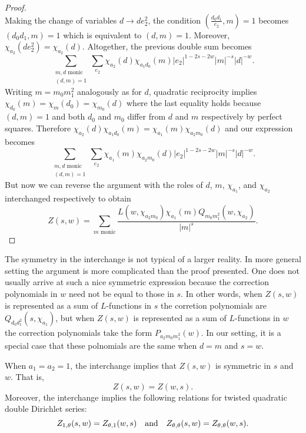 \documentclass[12pt,reqno,oneside]{amsart}
\begin{document}
\begin{proof}
\[        \]
        Making the change of variables $d \to de_{2}^{2}$, the condition $\left(\frac{d_{0}d_{1}}{e_{2}},m\right) = 1$ becomes $(d_{0}d_{1},m) = 1$ which is equivalent to $(d,m) = 1$. Moreover, $\chi_{a_{2}}(de_{2}^{2}) = \chi_{a_{2}}(d)$. Altogether, the previous double sum becomes
        \[
            \sum_{\substack{\text{$m,d$ monic} \\ (d,m) = 1}}\sum_{e_{2}}\chi_{a_{2}}(d)\chi_{a_{1}d_{0}}(m)|e_{2}|^{1-2s-2w}|m|^{-s}|d|^{-w}.
        \]
        Writing $m = m_{0}m_{1}^{2}$ analogously as for $d$, quadratic reciprocity implies $\chi_{d_{0}}(m) = \chi_{m}(d_{0}) = \chi_{m_{0}}(d)$ where the last equality holds because $(d,m) = 1$ and both $d_{0}$ and $m_{0}$ differ from $d$ and $m$ respectively by perfect squares. Therefore $\chi_{a_{2}}(d)\chi_{a_{1}d_{0}}(m) = \chi_{a_{1}}(m)\chi_{a_{2}m_{0}}(d)$ and our expression becomes
        \[
            \sum_{\substack{\text{$m,d$ monic} \\ (d,m) = 1}}\sum_{e_{2}}\chi_{a_{1}}(m)\chi_{a_{2}m_{0}}(d)|e_{2}|^{1-2s-2w}|m|^{-s}|d|^{-w}.
        \]
        But now we can reverse the argument with the roles of $d$, $m$, $\chi_{a_{1}}$, and $\chi_{a_{2}}$ interchanged respectively to obtain
        \[
            Z(s,w) = \sum_{\text{$m$ monic}}\frac{L(w,\chi_{a_{2}m_{0}})\chi_{a_{1}}(m)Q_{m_{0}m_{1}^{2}}(w,\chi_{a_{2}})}{|m|^{s}}.
        \]
    \end{proof}

    The symmetry in the interchange is not typical of a larger reality. In more general setting the argument is more complicated than the proof presented. One does not usually arrive at such a nice symmetric expression because the correction polynomials in $w$ need not be equal to those in $s$. In other words, when $Z(s,w)$ is represented as a sum of $L$-functions in $s$ the corretion polynomials are $Q_{d_{0}d_{1}^{2}}(s,\chi_{a_{1}})$, but when $Z(s,w)$ is represented as a sum of $L$-functions in $w$ the correction polynomials take the form $P_{a_{2}m_{0}m_{1}^{2}}(w)$. In our setting, it is a special case that these polnomials are the same when $d = m$ and $s = w$.

    \begin{remark}\label{rem:symmetry_of_Double_Dirichlet_series}
        When $a_{1} = a_{2} = 1$, the interchange implies that $Z(s,w)$ is symmetric in $s$ and $w$. That is,
        \[
            Z(s,w) = Z(w,s).
        \]
        Moreover, the interchange implies the following relations for twisted quadratic double Dirichlet series:
        \[
            Z_{1,\theta}(s,w) = Z_{\theta,1}(w,s) \quad \text{and} \quad Z_{\theta,\theta}(s,w) = Z_{\theta,\theta}(w,s).
        \]
    \end{remark}
\end{document}
